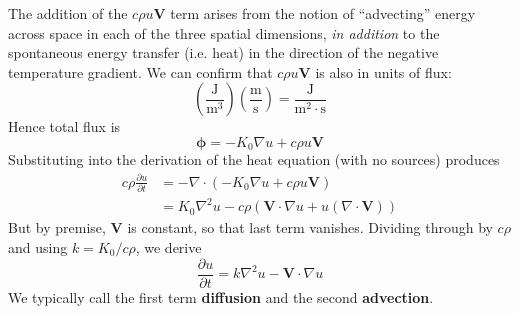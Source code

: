 \documentclass[a4paper]{article}
\begin{document}
The addition of the \( c \rho u \pmb{V} \) term arises from the notion of ``advecting'' energy across space in each of the three spatial dimensions, \textit{in addition} to the spontaneous energy transfer (i.e. heat) in the direction of the negative temperature gradient. We can confirm that \( c \rho u \pmb{V} \) is also in units of flux:
\[
	\!\left( \frac{\text{J}}{\text{m}^{3}} \right) \!\left( \frac{\text{m}}{\text{s}} \right) = \frac{\text{J}}{\text{m}^{2} \cdot \text{s}}
\]
Hence total flux is 
\[
	\pmb{\phi} = -K_{0}\nabla u + c \rho u \pmb{V} 
\]
Substituting into the derivation of the heat equation (with no sources) produces
\begin{align*}
	c \rho \frac{\partial u}{\partial t} & = -\nabla \cdot \!\left( -K_{0}\nabla u + c \rho u \pmb{V} \right) \\
	 & = K_{0}\nabla^{2}u - c \rho \!\left( \pmb{V} \cdot \nabla u + u \!\left( \nabla \cdot \pmb{V} \right) \right)
\end{align*}
But by premise, \( \pmb{V} \) is constant, so that last term vanishes. Dividing through by \( c \rho \) and using \( k = K_{0} / c \rho \), we derive
\[
	\frac{\partial u}{\partial t} = k \nabla^{2}u - \pmb{V} \cdot \nabla u
\]
We typically call the first term \textbf{diffusion} and the second \textbf{advection}.

\vspace{12pt}
\end{document}
